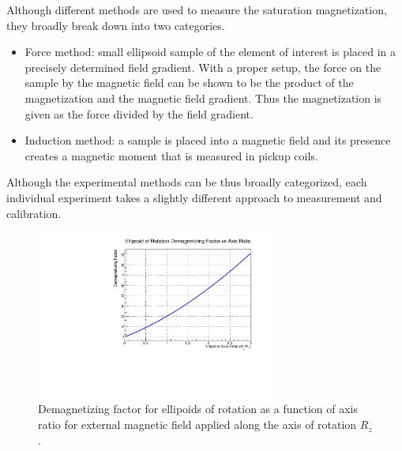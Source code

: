 \documentclass[12pt]{article}
\begin{document}
Although different methods are used to measure the saturation magnetization, they broadly break down into two categories. 
\begin{itemize}
\item{Force method: small ellipsoid sample of the element of interest is placed in a precisely determined field gradient. With a proper setup, the force on the sample by the magnetic field can be shown to be the product of the magnetization and the magnetic field gradient. Thus the magnetization is given as the force divided by the field gradient.}
\item{Induction method: a sample is placed into a magnetic field and its presence creates a magnetic moment that is measured in pickup coils.}
\end{itemize} 
     
Although the experimental methods can be thus broadly categorized, each individual experiment takes a slightly different approach to measurement and calibration.
\begin{figure}
\centering
\includegraphics[width=0.7\textwidth]{demagnetizing_factor.pdf}
\caption{Demagnetizing factor for ellipoids of rotation as a function of axis ratio for external magnetic field applied along the axis of rotation $R_z$.}
\label{fig:demag_ellipsoid}
\end{figure}
\end{document}
